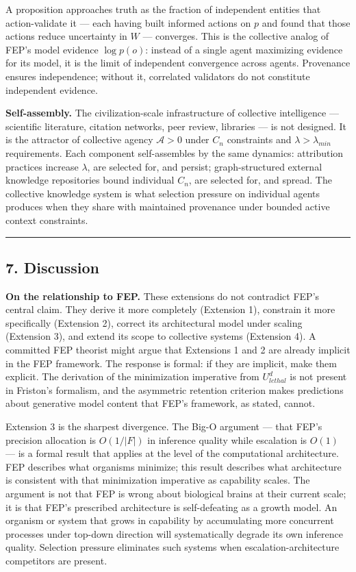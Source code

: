 \documentclass[
]{article}
\begin{document}
A proposition approaches truth as the fraction of independent entities
that action-validate it --- each having built informed actions on \(p\)
and found that those actions reduce uncertainty in \(W\) --- converges.
This is the collective analog of FEP's model evidence \(\log p(o)\):
instead of a single agent maximizing evidence for its model, it is the
limit of independent convergence across agents. Provenance ensures
independence; without it, correlated validators do not constitute
independent evidence.

\textbf{Self-assembly.} The civilization-scale infrastructure of
collective intelligence --- scientific literature, citation networks,
peer review, libraries --- is not designed. It is the attractor of
collective agency \(\mathcal{A} > 0\) under \(C_n\) constraints and
\(\lambda > \lambda_{min}\) requirements. Each component self-assembles
by the same dynamics: attribution practices increase \(\lambda\), are
selected for, and persist; graph-structured external knowledge
repositories bound individual \(C_n\), are selected for, and spread. The
collective knowledge system is what selection pressure on individual
agents produces when they share with maintained provenance under bounded
active context constraints.

\begin{center}\rule{0.5\linewidth}{0.5pt}\end{center}

\subsection{7. Discussion}\label{discussion}

\textbf{On the relationship to FEP.} These extensions do not contradict
FEP's central claim. They derive it more completely (Extension 1),
constrain it more specifically (Extension 2), correct its architectural
model under scaling (Extension 3), and extend its scope to collective
systems (Extension 4). A committed FEP theorist might argue that
Extensions 1 and 2 are already implicit in the FEP framework. The
response is formal: if they are implicit, make them explicit. The
derivation of the minimization imperative from \(U_{lethal}^d\) is not
present in Friston's formalism, and the asymmetric retention criterion
makes predictions about generative model content that FEP's framework,
as stated, cannot.

Extension 3 is the sharpest divergence. The Big-O argument --- that
FEP's precision allocation is \(O(1/|F|)\) in inference quality while
escalation is \(O(1)\) --- is a formal result that applies at the level
of the computational architecture. FEP describes what organisms
minimize; this result describes what architecture is consistent with
that minimization imperative as capability scales. The argument is not
that FEP is wrong about biological brains at their current scale; it is
that FEP's prescribed architecture is self-defeating as a growth model.
An organism or system that grows in capability by accumulating more
concurrent processes under top-down direction will systematically
degrade its own inference quality. Selection pressure eliminates such
systems when escalation-architecture competitors are present.
\end{document}
